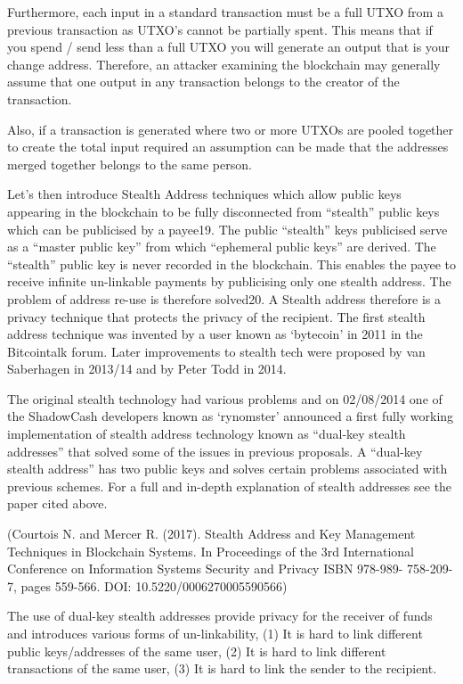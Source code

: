  

Furthermore, each input in a standard transaction must be a full UTXO from a previous transaction as UTXO’s cannot be partially spent. This means that if you spend / send less than a full UTXO you will generate an output that is your change address. Therefore, an attacker examining the blockchain may generally assume that one output in any transaction belongs to the creator of the transaction. 

 

Also, if a transaction is generated where two or more UTXOs are pooled together to create the total input required an assumption can be made that the addresses merged together belongs to the same person. 

 

Let’s then introduce Stealth Address techniques which allow public keys appearing in the blockchain to be fully disconnected from “stealth” public keys which can be publicised by a payee19. The public “stealth” keys publicised serve as a “master public key” from which “ephemeral public keys” are derived. The “stealth” public key is never recorded in the blockchain. This enables the payee to receive infinite un-linkable payments by publicising only one stealth address. The problem of address re-use is therefore solved20. A Stealth address therefore is a privacy technique that protects the privacy of the recipient. The first stealth address technique was invented by a user known as ‘bytecoin’ in 2011 in the Bitcointalk forum. Later improvements to stealth tech were proposed by van Saberhagen in 2013/14 and by Peter Todd in 
2014. 

 

The original stealth technology had various problems and on 02/08/2014 one of the ShadowCash developers known as ‘rynomster’ announced a first fully working implementation of stealth address technology known as “dual-key stealth addresses” that solved some of the issues in previous proposals. A “dual-key stealth address” has two public keys and solves certain problems associated with previous schemes. For a full and in-depth explanation of stealth addresses see the paper cited above. 

 

(Courtois N. and Mercer R. (2017). Stealth Address and Key Management Techniques in Blockchain Systems. In Proceedings of the 3rd International Conference on Information Systems Security and Privacy ISBN 978-989-
758-209-7, pages 559-566. DOI: 10.5220/0006270005590566) 

 

The use of dual-key stealth addresses provide privacy for the receiver of funds and introduces various forms of un-linkability, (1) It is hard to link different public keys/addresses of the same user, (2) It is hard to link different transactions of the same user, (3) It is hard to link the sender to the recipient.